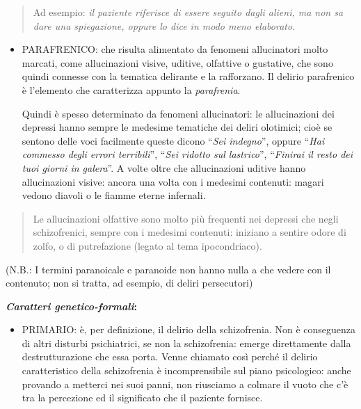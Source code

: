 \documentclass[]{article}
\begin{document}
\begin{quote}
Ad esempio: \emph{il paziente riferisce di essere seguito dagli alieni,
ma non sa dare una spiegazione, oppure lo dice in modo meno elaborato}.
\end{quote}

\begin{itemize}
\item
  PARAFRENICO: che risulta alimentato da fenomeni allucinatori molto
  marcati, come allucinazioni visive, uditive, olfattive o gustative,
  che sono quindi connesse con la tematica delirante e la rafforzano. Il
  delirio parafrenico è l'elemento che caratterizza appunto la
  \emph{parafrenia}.

  Quindi è spesso determinato da fenomeni allucinatori: le allucinazioni
  dei depressi hanno sempre le medesime tematiche dei deliri olotimici;
  cioè se sentono delle voci facilmente queste dicono ``\emph{Sei
  indegno}'', oppure ``\emph{Hai commesso degli errori terribili}'',
  ``\emph{Sei ridotto sul lastrico}'', ``\emph{Finirai il resto dei tuoi
  giorni in galera}''. A volte oltre che allucinazioni uditive hanno
  allucinazioni visive: ancora una volta con i medesimi contenuti:
  magari vedono diavoli o le fiamme eterne infernali.
\end{itemize}

\begin{quote}
Le allucinazioni olfattive sono molto più frequenti nei depressi che
negli schizofrenici, sempre con i medesimi contenuti: iniziano a sentire
odore di zolfo, o di putrefazione (legato al tema ipocondriaco).
\end{quote}

(N.B.: I termini paranoicale e paranoide non hanno nulla a che vedere
con il contenuto; non si tratta, ad esempio, di deliri persecutori)

\textbf{\emph{Caratteri genetico-formali}: }

\begin{itemize}
\item
  PRIMARIO: è, per definizione, il delirio della schizofrenia. Non è
  conseguenza di altri disturbi psichiatrici, se non la schizofrenia:
  emerge direttamente dalla destrutturazione che essa porta. Venne
  chiamato così perché il delirio caratteristico della schizofrenia è
  incomprensibile sul piano psicologico: anche provando a metterci nei
  suoi panni, non riusciamo a colmare il vuoto che c'è tra la percezione
  ed il significato che il paziente fornisce.
\end{itemize}
\end{document}
